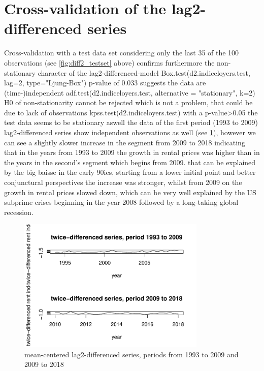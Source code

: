 \documentclass[11pt,a4paper]{article}
\begin{document}
\section{Cross-validation of the lag2-differenced series}

Cross-validation with a test data set considering only the last 35 of the 100 observations (see \cref{fig:diff2_testset} above) confirms furthermore the non-stationary character of the lag2-differenced-model 
Box.test(d2.indiceloyers.test, lag=2, type="Ljung-Box") p-value of 0.033 suggests the data are (time-)independent
adf.test(d2.indiceloyers.test, alternative = "stationary", k=2)  H0 of non-stationarity cannot be rejected which is not a problem, that could be due to lack of observations
kpss.test(d2.indiceloyers.test)  with a p-value>0.05 the test data seems to be stationary aswell
the data of the first period (1993 to 2009) lag2-differenced series show independent observations as well (see \cref{fig:diff2_test_train}), however we can see a slightly slower increase in the segment from 2009 to 2018 indicating that in the years from 1993 to 2009 the growth in rental prices was higher than in the years in the second's segment which begins from 2009. that can be explained by the big baisse in the early 90ies, starting from a lower initial point and better conjunctural perspectives the increase was stronger, whilst from 2009 on the growth in rental prices slowed down, which can be very well explained by the US subprime crises beginning in the year 2008 followed by a long-taking global recession.

\begin{figure}
    \centering
    \includegraphics[width=0.8\textwidth]{diff2_test_train}
    \caption{mean-centered lag2-differenced series, periods from 1993 to 2009 and 2009 to 2018}
    \label{fig:diff2_test_train}
\end{figure}
\end{document}
